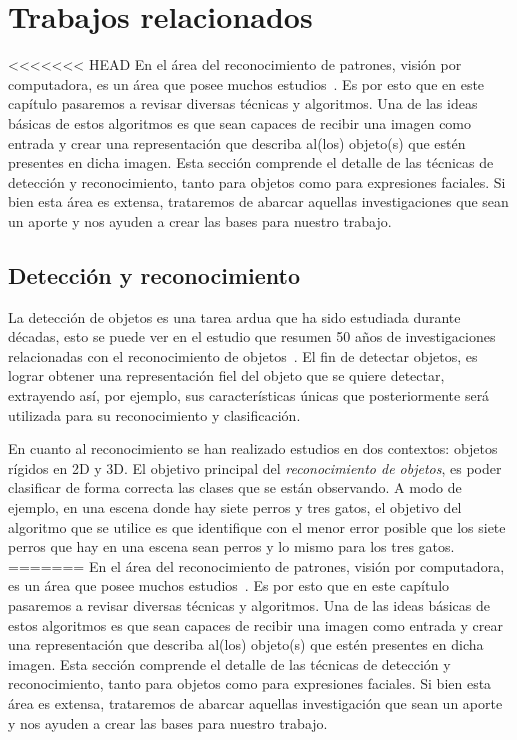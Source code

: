 \chapter[Trabajos relacionados ]{Trabajos relacionados }\label{ch:capitulo2}

<<<<<<< HEAD
En el área del reconocimiento de patrones, visión por computadora, es un área que posee muchos estudios~\cite{survey2005}. Es por esto que en este capítulo pasaremos a revisar diversas técnicas y algoritmos. Una de las ideas básicas de estos algoritmos es que sean capaces de recibir una imagen como entrada y crear una representación que describa al(los) objeto(s) que estén presentes en dicha imagen. Esta sección comprende el detalle de las técnicas de detección y reconocimiento, tanto para objetos como para expresiones faciales. Si bien esta área es extensa, trataremos de abarcar aquellas investigaciones que sean un aporte y nos ayuden a crear las bases para nuestro trabajo.

\section{Detección y reconocimiento}
La detección de objetos es una tarea ardua que ha sido estudiada durante décadas, esto se puede ver en el estudio que resumen 50 años de investigaciones relacionadas con el reconocimiento de objetos~\cite{Andreopoulos2013}. El fin de detectar objetos, es lograr obtener una representación fiel del objeto que se quiere detectar, extrayendo así, por ejemplo, sus características únicas que posteriormente será utilizada para su reconocimiento y clasificación.

En cuanto al reconocimiento se han realizado estudios en dos contextos: objetos rígidos en 2D y 3D\@. El objetivo principal del \textit{reconocimiento de objetos}, es poder clasificar de forma correcta las clases que se están observando. A modo de ejemplo, en una escena donde hay siete perros y tres gatos, el objetivo del algoritmo que se utilice es que identifique con el menor error posible que los siete perros que hay en una escena sean perros y lo mismo para los tres gatos.
=======
En el área del reconocimiento de patrones, visión por computadora, es un área que posee muchos estudios~\cite{survey2005}. Es por esto que en este capítulo pasaremos a revisar diversas técnicas y algoritmos. Una de las ideas básicas de estos algoritmos es que sean capaces de recibir una imagen como entrada y crear una representación que describa al(los) objeto(s) que estén presentes en dicha imagen. Esta sección comprende el detalle de las técnicas de detección y reconocimiento, tanto para objetos como para expresiones faciales. Si bien esta área es extensa, trataremos de abarcar aquellas investigación que sean un aporte y nos ayuden a crear las bases para nuestro trabajo.

